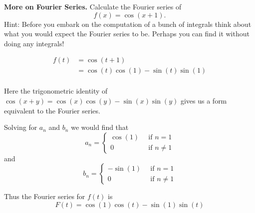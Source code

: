 \textbf{More on Fourier Series.} Calculate the Fourier series
of \[f(x) = \cos(x + 1).\] Hint: Before you embark on the computation
of a bunch of integrals think about what you would expect the Fourier
series to be. Perhaps you can find it without doing any integrals!

{\color{blue}

\begin{align*}
f(t) &= \cos(t+1) \\
     &= \cos(t) \cos(1) - \sin(t) \sin(1) \\
\end{align*}

Here the trigonometric identity of $\cos(x+y) = \cos(x)\cos(y)
- \sin(x)\sin(y)$ gives us a form equivalent to the Fourier series.

Solving for $a_n$ and $b_n$ we would find that
\[
a_n = \left\{
\begin{aligned}
\cos(1) &\,\,\, \text{if}\,\, n = 1 \\
0 &\,\,\, \text{if}\,\, n \ne 1
\end{aligned}
\right.
\]
and
\[
b_n = \left\{
\begin{aligned}
-\sin(1) &\,\,\, \text{if}\,\, n = 1 \\
0 &\,\,\, \text{if}\,\, n \ne 1
\end{aligned}
\right.
\]

Thus the Fourier series for $f(t)$ is
\[
F(t) = \cos(1)\cos(t) - \sin(1)\sin(t)
\]
}
